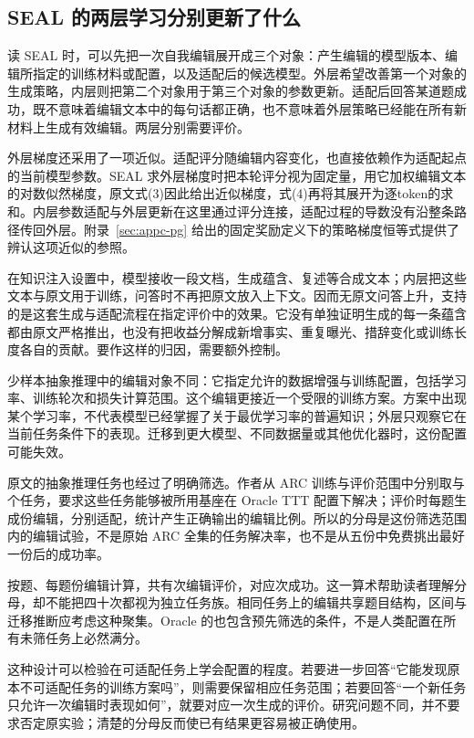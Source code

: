 \subsection{SEAL 的两层学习分别更新了什么}
\label{sec:ch10-sealloops}

读 SEAL 时，可以先把一次自我编辑展开成三个对象：产生编辑的模型版本、编辑所指定的训练材料或配置，以及适配后的候选模型。外层希望改善第一个对象的生成策略，内层则把第二个对象用于第三个对象的参数更新。适配后回答某道题成功，既不意味着编辑文本中的每句话都正确，也不意味着外层策略已经能在所有新材料上生成有效编辑。两层分别需要评价。

外层梯度还采用了一项近似。适配评分随编辑内容变化，也直接依赖作为适配起点的当前模型参数。SEAL 求外层梯度时把本轮评分视为固定量，用它加权编辑文本的对数似然梯度，原文式(3)因此给出近似梯度，式(4)再将其展开为逐token的求和\cite{seal-2506}。内层参数适配与外层更新在这里通过评分连接，适配过程的导数没有沿整条路径传回外层。附录~\ref{sec:appc-pg} 给出的固定奖励定义下的策略梯度恒等式提供了辨认这项近似的参照。

在知识注入设置中，模型接收一段文档，生成蕴含、复述等合成文本；内层把这些文本与原文用于训练，问答时不再把原文放入上下文。因而无原文问答上升，支持的是这套生成与适配流程在指定评价中的效果。它没有单独证明生成的每一条蕴含都由原文严格推出，也没有把收益分解成新增事实、重复曝光、措辞变化或训练长度各自的贡献。要作这样的归因，需要额外控制。

少样本抽象推理中的编辑对象不同：它指定允许的数据增强与训练配置，包括学习率、训练轮次和损失计算范围\cite{seal-2506}。这个编辑更接近一个受限的训练方案。方案中出现某个学习率，不代表模型已经掌握了关于最优学习率的普遍知识；外层只观察它在当前任务条件下的表现。迁移到更大模型、不同数据量或其他优化器时，这份配置可能失效。

原文的抽象推理任务也经过了明确筛选。作者从 ARC 训练与评价范围中分别取与个任务，要求这些任务能够被所用基座在 Oracle TTT 配置下解决；评价时每题生成份编辑，分别适配，统计产生正确输出的编辑比例\cite{seal-2506}。所以的分母是这份筛选范围内的编辑试验，不是原始 ARC 全集的任务解决率，也不是从五份中免费挑出最好一份后的成功率。

按题、每题份编辑计算，共有次编辑评价，对应次成功。这一算术帮助读者理解分母，却不能把四十次都视为独立任务族。相同任务上的编辑共享题目结构，区间与迁移推断应考虑这种聚集。Oracle 的也包含预先筛选的条件，不是人类配置在所有未筛任务上必然满分。

这种设计可以检验在可适配任务上学会配置的程度。若要进一步回答“它能发现原本不可适配任务的训练方案吗”，则需要保留相应任务范围；若要回答“一个新任务只允许一次编辑时表现如何”，就要对应一次生成的评价。研究问题不同，并不要求否定原实验；清楚的分母反而使已有结果更容易被正确使用。

